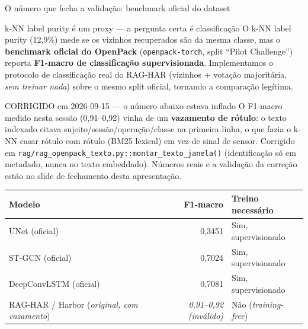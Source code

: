 \documentclass{beamer}
\newenvironment{numerobloco}[1]{\begin{block}{#1}}{\end{block}}
\newenvironment{decisaobloco}[1]{\begin{alertblock}{#1}}{\end{alertblock}}
\begin{document}
\begin{frame}{O número que fecha a validação: benchmark oficial do dataset}
  \small
  \begin{numerobloco}{k-NN label purity é um proxy — a pergunta certa é classificação}
    O k-NN label purity (12,9\%) mede se os vizinhos recuperados são da mesma classe, mas o
    \textbf{benchmark oficial do OpenPack} (\texttt{openpack-torch}, split ``Pilot Challenge'')
    reporta \textbf{F1-macro de classificação supervisionada}. Implementamos o protocolo de
    classificação real do RAG-HAR (vizinhos + votação majoritária, \emph{sem treinar nada}) sobre
    o mesmo split oficial, tornando a comparação legítima.
  \end{numerobloco}

  \pause
  \begin{decisaobloco}{CORRIGIDO em 2026-09-15 — o número abaixo estava inflado}
    O F1-macro medido nesta sessão (0,91--0,92) vinha de um \textbf{vazamento de rótulo}: o
    texto indexado citava sujeito/sessão/operação/classe na primeira linha, o que fazia o k-NN
    casar rótulo com rótulo (BM25 lexical) em vez de sinal de sensor. Corrigido em
    \texttt{rag/rag\_openpack\_texto.py::montar\_texto\_janela()} (identificação só em
    metadado, nunca no texto embeddado). Números reais e a validação da correção estão no
    slide de fechamento desta apresentação.
  \end{decisaobloco}

  \pause
  \begin{center}
  \begin{tabular}{lrl}
    \toprule
    Modelo & F1-macro & Treino necessário \\
    \midrule
    UNet (oficial) & 0,3451 & Sim, supervisionado \\
    ST-GCN (oficial) & 0,7024 & Sim, supervisionado \\
    DeepConvLSTM (oficial) & 0,7081 & Sim, supervisionado \\
    RAG-HAR / Harbor (\emph{original, com vazamento}) & \emph{0,91--0,92 (inválido)} & Não (\emph{training-free}) \\
    \bottomrule
  \end{tabular}
  \end{center}
\end{frame}
\end{document}
